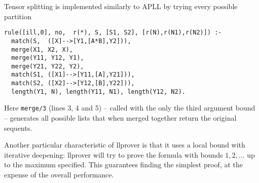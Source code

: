 Tensor splitting is implemented similarly to APLL by trying every possible partition
\begin{verbatim}
rule([ill,0], no,  r(*), S, [S1, S2], [r(N),r(N1),r(N2)]) :-
  match(S,  ([X]-->[Y1,[A*B],Y2])),
  merge(X1, X2, X),
  merge(Y11, Y12, Y1),
  merge(Y21, Y22, Y2),
  match(S1, ([X1]-->[Y11,[A],Y21])),
  match(S2, ([X2]-->[Y12,[B],Y22])),
  length(Y1, N), length(Y11, N1), length(Y12, N2).
\end{verbatim}
Here \texttt{merge/3} (lines 3, 4 and 5) -- called with the only the third argument bound -- generates all possible lists that when merged together return the original sequents.

Another particular characteristic of llprover is that it uses a local bound with iterative deepening: llprover will try to prove the formula with bounds $1, 2, \dots$ up to the maximum specified.
This guarantees finding the simplest proof, at the expense of the overall performance.

